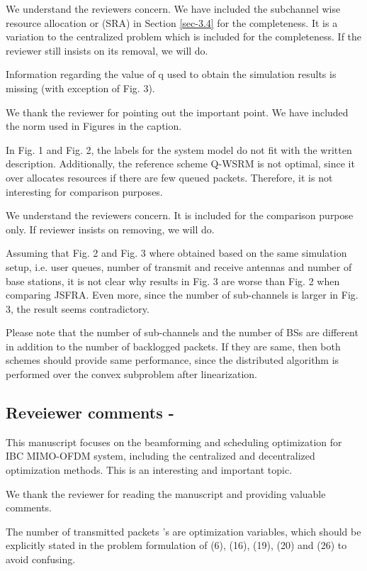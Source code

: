 \resp We understand the reviewers concern. We have included the subchannel wise resource allocation or (SRA) in Section \ref{sec-3.4} for the completeness. It is a variation to the centralized problem which is included for the completeness. If the reviewer still insists on its removal, we will do.

 Information regarding the value of q used to obtain the simulation results is missing (with exception of Fig. 3).

\resp We thank the reviewer for pointing out the important point. We have included the norm used in Figures in the caption.

 In Fig. 1 and Fig. 2, the labels for the system model do not fit with the written description. Additionally, the reference scheme Q-WSRM is not optimal, since it over allocates resources if there are few queued packets. Therefore, it is not interesting for comparison purposes.

\resp We understand the reviewers concern. It is included for the comparison purpose only. If reviewer insists on removing, we will do.

 Assuming that Fig. 2 and Fig. 3 where obtained based on the same simulation setup, i.e. user queues, number of transmit and receive antennas and number of base stations, it is not clear why results in Fig. 3 are worse than Fig. 2 when comparing JSFRA. Even more, since the number of sub-channels is larger in Fig. 3, the result seems contradictory.

\resp Please note that the number of sub-channels and the number of \acp{BS} are different in addition to the number of backlogged packets. If they are same, then both schemes should provide same performance, since the distributed algorithm is performed over the convex subproblem after linearization.

\subsection*{Reveiewer comments - }

 This manuscript focuses on the beamforming and scheduling optimization for IBC MIMO-OFDM system, including the centralized and decentralized optimization methods. This is an interesting and important topic.

\resp We thank the reviewer for reading the manuscript and providing valuable comments.

 The number of transmitted packets 's are optimization variables, which should be explicitly stated in the problem formulation of (6), (16), (19), (20) and (26) to avoid confusing.

